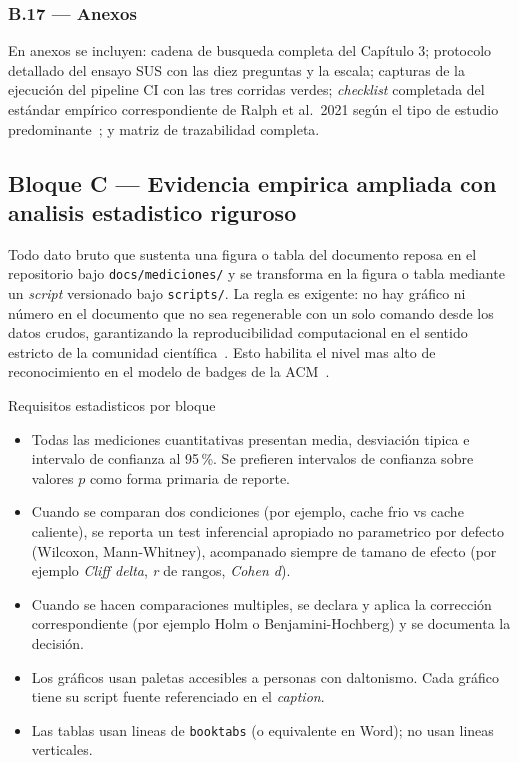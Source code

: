 \documentclass[11pt,a4paper]{article}
\begin{document}
\subsubsection*{B.17 --- Anexos}

En anexos se incluyen: cadena de busqueda completa del Cap\'{i}tulo 3; protocolo detallado del ensayo SUS con las diez preguntas y la escala; capturas de la ejecuci\'{o}n del pipeline CI con las tres corridas verdes; \emph{checklist} completada del est\'{a}ndar emp\'{i}rico correspondiente de Ralph et al.\ 2021 seg\'{u}n el tipo de estudio predominante~\cite{ralph2021empirical}; y matriz de trazabilidad completa.

\subsection{Bloque C --- Evidencia empirica ampliada con analisis estadistico riguroso}

Todo dato bruto que sustenta una figura o tabla del documento reposa en el repositorio bajo \texttt{docs/mediciones/} y se transforma en la figura o tabla mediante un \emph{script} versionado bajo \texttt{scripts/}. La regla es exigente: no hay gr\'{a}fico ni n\'{u}mero en el documento que no sea regenerable con un solo comando desde los datos crudos, garantizando la reproducibilidad computacional en el sentido estricto de la comunidad cient\'{i}fica~\cite{peng2011reproducible,sandve2013ten}. Esto habilita el nivel mas alto de reconocimiento en el modelo de badges de la ACM~\cite{acm2020artifact}.

\begin{cajaestudio}{Requisitos estadisticos por bloque}
    \begin{itemize}
        \item Todas las mediciones cuantitativas presentan media, desviaci\'{o}n tipica e intervalo de confianza al 95\,\%. Se prefieren intervalos de confianza sobre valores $p$ como forma primaria de reporte.
        \item Cuando se comparan dos condiciones (por ejemplo, cache frio vs cache caliente), se reporta un test inferencial apropiado no parametrico por defecto (Wilcoxon, Mann-Whitney), acompanado siempre de tamano de efecto (por ejemplo \emph{Cliff delta}, \emph{r} de rangos, \emph{Cohen d}).
        \item Cuando se hacen comparaciones multiples, se declara y aplica la correcci\'{o}n correspondiente (por ejemplo Holm o Benjamini-Hochberg) y se documenta la decisi\'{o}n.
        \item Los gr\'{a}ficos usan paletas accesibles a personas con daltonismo. Cada gr\'{a}fico tiene su script fuente referenciado en el \emph{caption}.
        \item Las tablas usan lineas de \texttt{booktabs} (o equivalente en Word); no usan lineas verticales.
    \end{itemize}
\end{cajaestudio}
\end{document}
